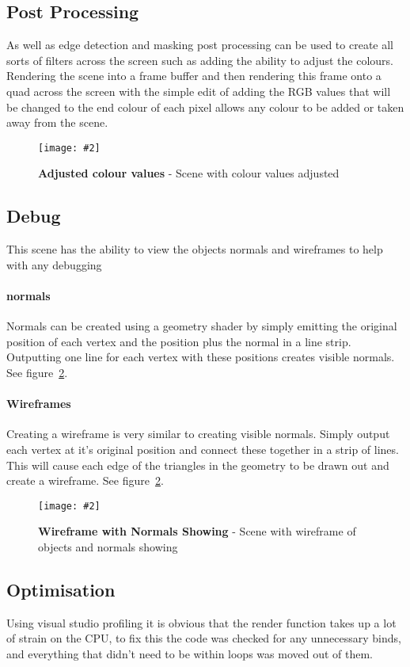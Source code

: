 \documentclass[10pt, a4paper]{article}
\newcommand{\figuremacro}[5]{
    \begin{figure}[#1]
        \centering
        \texttt{[image: \#2]}
        \caption[#3]{\textbf{#3}#4}
        \label{fig:#2}
    \end{figure}
}
\begin{document}
 	 \subsection{Post Processing}
 	 
 	 As well as edge detection and masking post processing can be used to create all sorts of filters across the screen such as adding the ability to adjust the colours. Rendering the scene into a frame buffer and then rendering this frame onto a quad across the screen with the simple edit of adding the RGB values that will be changed to the end colour of each pixel allows any colour to be added or taken away from the scene.
 	 
 	 \figuremacro{h}{colours}{Adjusted colour values}{ - Scene with colour values adjusted}{1.0}
	
	\subsection{Debug}
	
	This scene has the ability to view the objects normals and wireframes to help with any debugging
	\paragraph{normals}
	Normals can be created using a geometry shader by simply emitting the original position of each vertex and the position plus the normal in a line strip. Outputting one line for each vertex with these positions creates visible normals. See figure~\ref{fig:wirenorms}.
	\paragraph{Wireframes}
	Creating a wireframe is very similar to creating visible normals. Simply output each vertex at it's original position and connect these together in a strip of lines. This will cause each edge of the triangles in the geometry to be drawn out and create a wireframe. See figure~\ref{fig:wirenorms}.
	
	 \figuremacro{h}{wirenorms}{Wireframe with Normals Showing}{ - Scene with wireframe of objects and normals showing}{1.0}
	 
	\subsection{Optimisation}
	Using visual studio profiling it is obvious that the render function takes up a lot of strain on the CPU, to fix this the code was checked for any unnecessary binds, and everything that didn't need to be within loops was moved out of them.  
	
\end{document}
